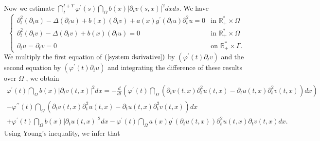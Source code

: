 \documentclass[11pt,reqno]{amsart}
\theoremstyle{plain}
\numberwithin{equation}{section}
\numberwithin{equation}{section}
\begin{document}
Now we estimate $\dint_{t}^{t+T}\varphi ^{\prime }\left( s\right)
\dint_{\Omega }b\left( x\right) \left\vert \partial _{t}v\left( s,x\right)
\right\vert ^{2}dxds.$ We have 
\begin{equation}
\left\{ 
\begin{array}{ll}
\partial _{t}^{2}\left( \partial _{t}u\right) -\Delta \left( \partial
_{t}u\right) +b(x)\left( \partial _{t}v\right) +a(x)g^{\prime }\left(
\partial _{t}u\right) \partial _{t}^{2}u=0 & \text{in }\mathbb{R}_{+}^{\ast
}\times \Omega \\ 
\partial _{t}^{2}\left( \partial _{t}v\right) -\Delta \left( \partial
_{t}v\right) +b(x)\left( \partial _{t}u\right) =0 & \text{in }\mathbb{R}%
_{+}^{\ast }\times \Omega \\ 
\partial _{t}u=\partial _{t}v=0 & \text{on }\mathbb{R}_{+}^{\ast }\times
\Gamma .%
\end{array}%
\right.  \label{system derivative}
\end{equation}%
We multiply the first equation of $\left( \ref{system derivative}\right) $
by $\left( \varphi ^{\prime }\left( t\right) \partial _{t}v\right) $ and the
second equation by $\left( \varphi ^{\prime }\left( t\right) \partial
_{t}u\right) $ and integrating the difference of these results over $\Omega $%
, we obtain%
\begin{equation*}
\begin{array}{l}
\varphi ^{\prime }\left( t\right) \dint_{\Omega }b\left( x\right) \left\vert
\partial _{t}v\left( t,x\right) \right\vert ^{2}dx=-\frac{d}{dt}\left(
\varphi ^{\prime }\left( t\right) \dint_{\Omega }\left( \partial _{t}v\left(
t,x\right) \partial _{t}^{2}u\left( t,x\right) -\partial _{t}u\left(
t,x\right) \partial _{t}^{2}v\left( t,x\right) \right) dx\right) \\ 
-\varphi ^{\prime \prime }\left( t\right) \dint_{\Omega }\left( \partial
_{t}v\left( t,x\right) \partial _{t}^{2}u\left( t,x\right) -\partial
_{t}u\left( t,x\right) \partial _{t}^{2}v\left( t,x\right) \right) dx \\ 
+\varphi ^{\prime }\left( t\right) \dint_{\Omega }b\left( x\right)
\left\vert \partial _{t}u\left( t,x\right) \right\vert ^{2}dx-\varphi
^{\prime }\left( t\right) \dint_{\Omega }a\left( x\right) g^{\prime }\left(
\partial _{t}u\left( t,x\right) \right) \partial _{t}^{2}u\left( t,x\right)
\partial _{t}v\left( t,x\right) dx.%
\end{array}%
\end{equation*}%
Using Young's inequality, we infer that%
\end{document}
